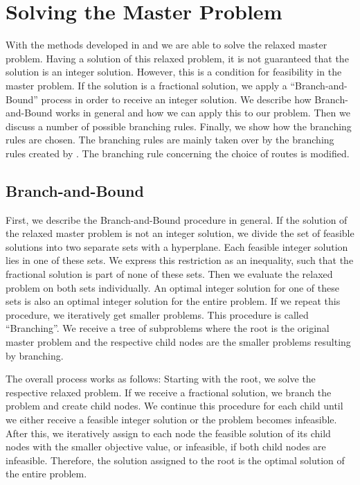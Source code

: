 \section{Solving the Master Problem}
\label{sec:solving_masterproblem}

With the methods developed in  and  we are able to solve the relaxed master problem. Having a solution of this relaxed problem, it is not guaranteed that the solution is an integer solution. However, this is a condition for feasibility in the master problem. If the solution is a fractional solution, we apply a \enquote{Branch-and-Bound} process in order to receive an integer solution. We describe how Branch-and-Bound works in general and how we can apply this to our problem. Then we discuss a number of possible branching rules. Finally, we show how the branching rules are chosen. The branching rules are mainly taken over by the branching rules created by \cite[Sec.~8.2]{Kaiser}. The branching rule concerning the choice of routes is modified.

\subsection{Branch-and-Bound}

First, we describe the Branch-and-Bound procedure in general. If the solution of the relaxed master problem is not an integer solution, we divide the set of feasible solutions into two separate sets with a hyperplane. Each feasible integer solution lies in one of these sets. We express this restriction as an inequality, such that the fractional solution is part of none of these sets. Then we evaluate the relaxed problem on both sets individually. An optimal integer solution for one of these sets is also an optimal integer solution for the entire problem. If we repeat this procedure, we iteratively get smaller problems. This procedure is called \enquote{Branching}. We receive a tree of subproblems where the root is the original master problem and the respective child nodes are the smaller problems resulting by branching.

The overall process works as follows: Starting with the root, we solve the respective relaxed problem. If we receive a fractional solution, we branch the problem and create child nodes. We continue this procedure for each child until we either receive a feasible integer solution or the problem becomes infeasible. After this, we iteratively assign to each node the feasible solution of its child nodes with the smaller objective value, or infeasible, if both child nodes are infeasible. Therefore, the solution assigned to the root is the optimal solution of the entire problem.

